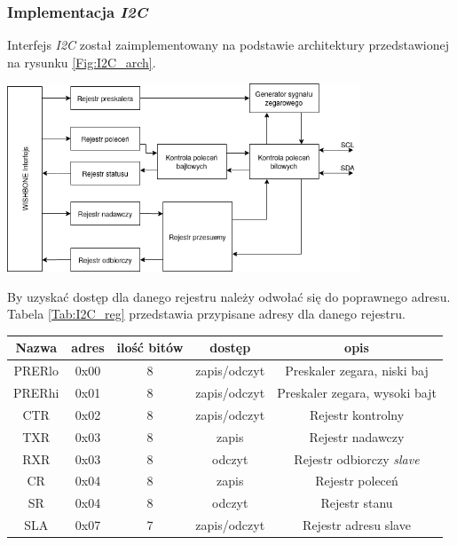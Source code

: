 \documentclass[11pt,a4paper]{article}
\begin{document}
		\subsubsection{Implementacja \textit{I2C}}
		\hspace{5mm} Interfejs \textit{I2C} został zaimplementowany na podstawie architektury przedstawionej na rysunku \ref{Fig:I2C_arch}. \\
			\begin{minipage}[c]{\textwidth}

					\includegraphics[width=\textwidth,height=5.6cm]{./rysunki/i2c_arch.png}
			\end{minipage} 
			By uzyskać dostęp dla danego rejestru należy odwołać się do poprawnego adresu. Tabela \ref{Tab:I2C_reg} przedstawia przypisane adresy dla danego rejestru.\\
			 \begin{minipage}{\textwidth}
		 \begin{center}
				\begin{tabular}{|c|c|c|c|c|}
					\hline
					Nazwa & adres & ilość bitów & dostęp & opis \\ 
					\hline
					PRERlo & 0x00 & 8 & zapis/odczyt & Preskaler zegara, niski baj \\
					\hline
					PRERhi & 0x01 & 8 &zapis/odczyt & Preskaler zegara, wysoki bajt \\
					\hline
					CTR & 0x02 & 8 &zapis/odczyt & Rejestr kontrolny\\
					\hline
					TXR & 0x03 & 8 &zapis & Rejestr nadawczy\\
					\hline
					RXR & 0x03 & 8 & odczyt & Rejestr odbiorczy \textit{slave} \\
					\hline
					CR & 0x04 & 8 & zapis & Rejestr poleceń\\
					\hline
					SR & 0x04 & 8 & odczyt & Rejestr stanu\\
					\hline
					SLA & 0x07 & 7 &zapis/odczyt & Rejestr adresu slave\\
					\hline
				\end{tabular}
		\end{center}
		\end{minipage}
\end{document}
